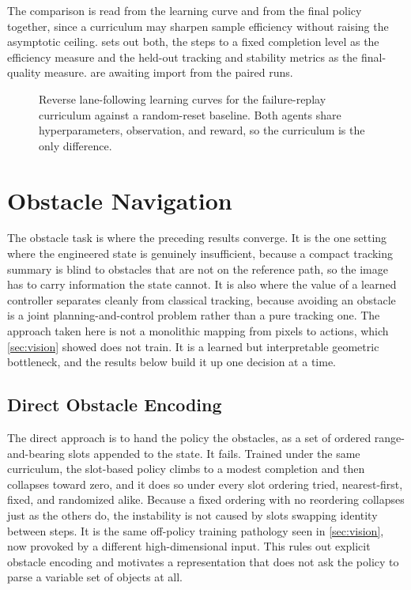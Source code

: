 The comparison is read from the learning curve and from the final policy together, since a curriculum may sharpen sample efficiency without raising the asymptotic ceiling.  sets out both, the steps to a fixed completion level as the efficiency measure and the held-out tracking and stability metrics as the final-quality measure.  are awaiting import from the paired runs.



\begin{figure}[H]
    \centering
    \caption{Reverse lane-following learning curves for the failure-replay curriculum against a random-reset baseline. Both agents share hyperparameters, observation, and reward, so the curriculum is the only difference.}
    \label{fig:failure_replay_curve}
\end{figure}

\section{Obstacle Navigation}
\label{sec:obstacle_results}

The obstacle task is where the preceding results converge. It is the one setting where the engineered state is genuinely insufficient, because a compact tracking summary is blind to obstacles that are not on the reference path, so the image has to carry information the state cannot. It is also where the value of a learned controller separates cleanly from classical tracking, because avoiding an obstacle is a joint planning-and-control problem rather than a pure tracking one. The approach taken here is not a monolithic mapping from pixels to actions, which \cref{sec:vision} showed does not train. It is a learned but interpretable geometric bottleneck, and the results below build it up one decision at a time.

\subsection{Direct Obstacle Encoding}

The direct approach is to hand the policy the obstacles, as a set of ordered range-and-bearing slots appended to the state. It fails. Trained under the same curriculum, the slot-based policy climbs to a modest completion and then collapses toward zero, and it does so under every slot ordering tried, nearest-first, fixed, and randomized alike. Because a fixed ordering with no reordering collapses just as the others do, the instability is not caused by slots swapping identity between steps. It is the same off-policy training pathology seen in \cref{sec:vision}, now provoked by a different high-dimensional input. This rules out explicit obstacle encoding and motivates a representation that does not ask the policy to parse a variable set of objects at all.

